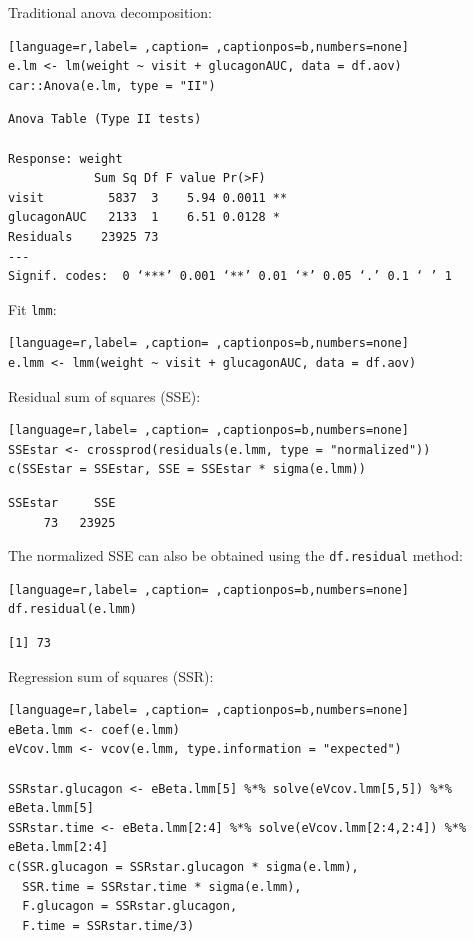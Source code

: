 \documentclass[12pt]{article}
\begin{document}
Traditional anova decomposition:
\begin{lstlisting}[language=r,label= ,caption= ,captionpos=b,numbers=none]
e.lm <- lm(weight ~ visit + glucagonAUC, data = df.aov)
car::Anova(e.lm, type = "II")
\end{lstlisting}

\begin{verbatim}
Anova Table (Type II tests)

Response: weight
            Sum Sq Df F value Pr(>F)   
visit         5837  3    5.94 0.0011 **
glucagonAUC   2133  1    6.51 0.0128 * 
Residuals    23925 73                  
---
Signif. codes:  0 ‘***’ 0.001 ‘**’ 0.01 ‘*’ 0.05 ‘.’ 0.1 ‘ ’ 1
\end{verbatim}


Fit \texttt{lmm}:
\begin{lstlisting}[language=r,label= ,caption= ,captionpos=b,numbers=none]
e.lmm <- lmm(weight ~ visit + glucagonAUC, data = df.aov)
\end{lstlisting}

Residual sum of squares (SSE):
\begin{lstlisting}[language=r,label= ,caption= ,captionpos=b,numbers=none]
SSEstar <- crossprod(residuals(e.lmm, type = "normalized"))
c(SSEstar = SSEstar, SSE = SSEstar * sigma(e.lmm))
\end{lstlisting}

\begin{verbatim}
SSEstar     SSE 
     73   23925
\end{verbatim}


The normalized SSE can also be obtained using the \texttt{df.residual} method:
\begin{lstlisting}[language=r,label= ,caption= ,captionpos=b,numbers=none]
df.residual(e.lmm)
\end{lstlisting}

\begin{verbatim}
[1] 73
\end{verbatim}


Regression sum of squares (SSR):
\begin{lstlisting}[language=r,label= ,caption= ,captionpos=b,numbers=none]
eBeta.lmm <- coef(e.lmm)
eVcov.lmm <- vcov(e.lmm, type.information = "expected")

SSRstar.glucagon <- eBeta.lmm[5] %*% solve(eVcov.lmm[5,5]) %*% eBeta.lmm[5] 
SSRstar.time <- eBeta.lmm[2:4] %*% solve(eVcov.lmm[2:4,2:4]) %*% eBeta.lmm[2:4] 
c(SSR.glucagon = SSRstar.glucagon * sigma(e.lmm),
  SSR.time = SSRstar.time * sigma(e.lmm),
  F.glucagon = SSRstar.glucagon,
  F.time = SSRstar.time/3)
\end{lstlisting}
\end{document}
